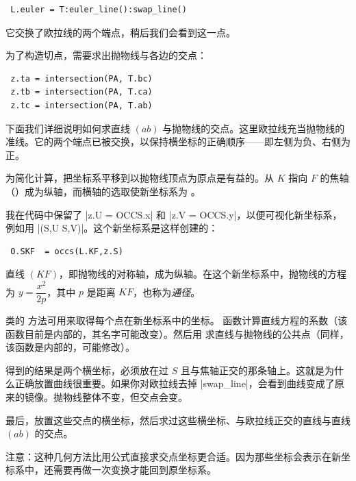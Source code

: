 \begin{mybox}
\begin{verbatim}
 L.euler = T:euler_line():swap_line()
\end{verbatim}
\end{mybox}

它交换了欧拉线的两个端点，稍后我们会看到这一点。

为了构造切点，需要求出抛物线与各边的交点：

\begin{mybox}
\begin{verbatim}
 z.ta = intersection(PA, T.bc)
 z.tb = intersection(PA, T.ca)
 z.tc = intersection(PA, T.ab)
\end{verbatim}
\end{mybox}

下面我们详细说明如何求直线 $(ab)$ 与抛物线的交点。这里欧拉线充当抛物线的准线。它的两个端点已被交换，以保持横坐标的正确顺序——即左侧为负、右侧为正。

为简化计算，把坐标系平移到以抛物线顶点为原点是有益的。从 $K$ 指向 $F$ 的焦轴（）成为纵轴，而横轴的选取使新坐标系为 。

我在代码中保留了 |z.U = OCCS.x| 和 |z.V = OCCS.y|，以便可视化新坐标系，例如用 |\tkzDrawSegments[red,->](S,U S,V)|。这个新坐标系是这样创建的：

\begin{mybox}
\begin{verbatim}
 O.SKF  = occs(L.KF,z.S)
\end{verbatim}
\end{mybox}

直线 $(KF)$，即抛物线的对称轴，成为纵轴。在这个新坐标系中，抛物线的方程为 $y = \dfrac{x^2}{2p}$，其中 $p$ 是距离 $KF$，也称为\emph{通径}。

 类的  方法可用来取得每个点在新坐标系中的坐标。 函数计算直线方程的系数（该函数目前是内部的，其名字可能改变）。然后用  求直线与抛物线的公共点（同样，该函数是内部的，可能修改）。

得到的结果是两个横坐标，必须放在过 $S$ 且与焦轴正交的那条轴上。这就是为什么正确放置曲线很重要。如果你对欧拉线去掉 |swap_line|，会看到曲线变成了原来的镜像。抛物线整体不变，但交点会变。

最后，放置这些交点的横坐标，然后求过这些横坐标、与欧拉线正交的直线与直线 $(ab)$ 的交点。

注意：这种几何方法比用公式直接求交点坐标更合适。因为那些坐标会表示在新坐标系中，还需要再做一次变换才能回到原坐标系。


